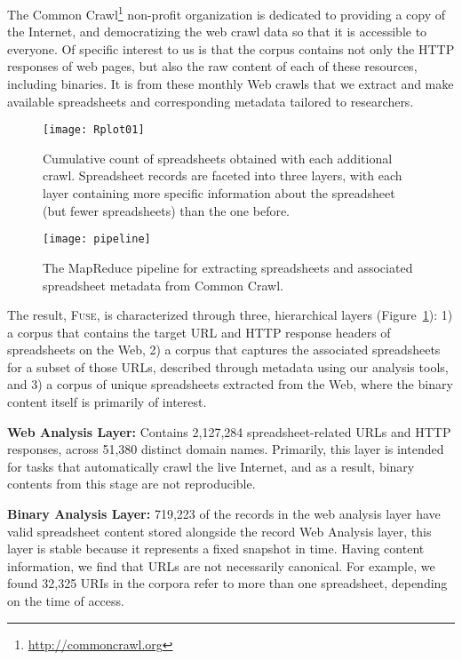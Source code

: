 \documentclass[conference]{IEEEtran}
\begin{document}
The Common Crawl\footnote{\url{http://commoncrawl.org}} non-profit organization is dedicated to providing a copy of the Internet, and democratizing the web crawl data so that it is accessible to everyone. 
%
Of specific interest to us is that the corpus contains not only the HTTP responses of web pages, but also the raw content of each of these resources, including binaries. It is from these monthly Web crawls that we extract and make available spreadsheets and corresponding metadata tailored to researchers.

\begin{figure}[!t]
\centering
% 
\texttt{[image: Rplot01]}
\caption{Cumulative count of spreadsheets obtained with each additional crawl. Spreadsheet records are faceted into three layers, with each layer containing more specific information about the spreadsheet (but fewer spreadsheets) than the one before.\label{fig:rplot}}
\end{figure}

\begin{figure*}[!t]
\centering
\texttt{[image: pipeline]}
\caption{The MapReduce pipeline for extracting spreadsheets and associated spreadsheet metadata from Common Crawl.\label{fig:mrpipeline}}
\end{figure*}


The result, \textsc{Fuse}, is characterized through three, hierarchical layers (Figure~\ref{fig:rplot}): 1) a corpus that contains the target URL and HTTP response headers of spreadsheets on the Web, 2) a corpus that captures the associated spreadsheets for a subset of those URLs, described through metadata using our analysis tools, and 3) a corpus of unique spreadsheets extracted from the Web, where the binary content itself is primarily of interest.

\textbf{Web Analysis Layer:} Contains 2,127,284 spreadsheet-related URLs and HTTP responses, across 51,380 distinct domain names. Primarily, this layer is intended for tasks that automatically crawl the live Internet, and as a result, binary contents from this stage are not reproducible.

\textbf{Binary Analysis Layer:} 719,223 of the records in the web analysis layer have valid spreadsheet content stored alongside the record Web Analysis layer, this layer is stable because it represents a fixed snapshot in time. Having content information, we find that URLs are not necessarily canonical. For example, we found 32,325 URIs in the corpora refer to more than one spreadsheet, depending on the time of access.
\end{document}
